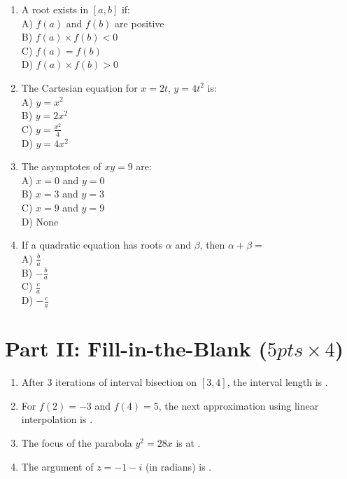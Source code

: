 \documentclass[12pt]{article}
\begin{document}
\begin{enumerate}
\item 
A root exists in $[a, b]$ if:\\
A) $ f(a) $ and $ f(b) $ are positive\\
B) $ f(a) \times f(b) < 0 $\\
C) $ f(a) = f(b) $\\
D) $ f(a) \times f(b) > 0 $

\item 
The Cartesian equation for $ x = 2t $, $ y = 4t^2 $ is:\\
A) $ y = x^2 $\\
B) $ y = 2x^2 $\\
C) $ y = \frac{x^2}{4} $\\
D) $ y = 4x^2 $

\item 
The asymptotes of $ xy = 9 $ are:\\
A) $ x = 0 $ and $ y = 0 $\\
B) $ x = 3 $ and $ y = 3 $\\
C) $ x = 9 $ and $ y = 9 $\\
D) None

\item 
If a quadratic equation has roots $ \alpha $ and $ \beta $, then $ \alpha + \beta = $\\
A) $ \frac{b}{a} $\\
B) $ -\frac{b}{a} $\\
C) $ \frac{c}{a} $\\
D) $ -\frac{c}{a} $
\end{enumerate}

\section*{Part II: Fill-in-the-Blank ($5 pts \times 4$)}
\begin{enumerate}
\item After 3 iterations of interval bisection on $[3, 4]$, the interval length is \underline{\hspace{2cm}}.

\item For $ f(2) = -3 $ and $ f(4) = 5 $, the next approximation using linear interpolation is \underline{\hspace{2cm}}.

\item The focus of the parabola $ y^2 = 28x $ is at \underline{\hspace{2cm}}.

\item The argument of $ z = -1 - i $ (in radians) is \underline{\hspace{2cm}}.
\end{enumerate}
\end{document}

